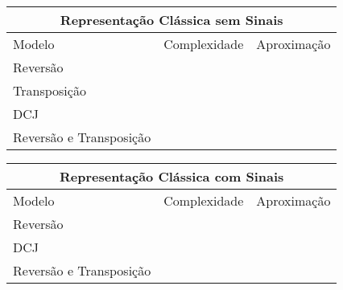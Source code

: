 \begin{table}[]\label{table:XZPFGPAM}
\centering
\begin{tabular}{|p{8cm}|p{3cm}|p{3cm}|}
\hline
\multicolumn{3}{|c|}{Representação Clássica sem Sinais}       \\ \hline
Modelo                  & Complexidade & Aproximação          \\ \hline
Reversão                &              &                      \\ \hline
Transposição            &              &                      \\ \hline
DCJ                     &              &                      \\ \hline
Reversão e Transposição &              &                      \\ \hline
\end{tabular}

\hfill \break

\begin{tabular}{|p{8cm}|p{3cm}|p{3cm}|}
\hline
\multicolumn{3}{|c|}{Representação Clássica com Sinais}       \\ \hline
Modelo                  & Complexidade & Aproximação          \\ \hline
Reversão                &              &                      \\ \hline
DCJ                     &              &                      \\ \hline
Reversão e Transposição &              &                      \\ \hline
\end{tabular}
\end{table}